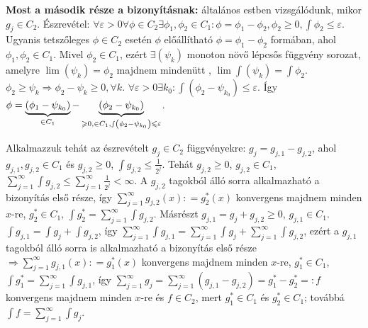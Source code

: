 \documentclass[12pt,a4paper]{scrartcl}
\newenvironment{bizonyitas}{}{}
\begin{document}
\begin{bizonyitas}
\textbf{Most a második része a bizonyításnak:} általános estben
vizsgálódunk, mikor \(g_{j} \in C_{2}\). Észrevétel:
\(\forall\varepsilon > 0\forall\phi \in C_{2}\exists\phi_{1},\phi_{2} \in C_{1}:\phi = \phi_{1} - \phi_{2},\phi_{2} \geq 0,{\int{\phi_{2} \leq \varepsilon}}\).
Ugyanis tetszőleges \(\phi \in C_{2}\) esetén \(\phi\) előállítható
\(\phi = \phi_{1} - \phi_{2}\) formában, ahol
\(\phi_{1},\phi_{2} \in C_{1}\). Mivel \(\phi_{2} \in C_{1}\), ezért
\(\exists\left( \psi_{k} \right)\) monoton növő lépcsős függvény
sorozat, amelyre \(\lim\left( \psi_{k} \right) = \phi_{2}\) majdnem
mindenütt , \(\lim{\int{\left( \psi_{k} \right) = {\int\phi_{2}}}}\).
\(\left. \phi_{2} \geq \psi_{k}\Rightarrow\phi_{2} - \psi_{k} \geq 0,\forall k \right.\).
\(\forall\varepsilon > 0\exists k_{0}:{\int\left( {\phi_{2} - \psi_{k_{0}}} \right)} \leq \varepsilon\).
Így
\(\phi = \underbrace {\left( {{\phi _1} - {\psi _{{k_0}}}} \right)}_{ \in {C_1}} - \underbrace {\left( {{\phi _2} - {\psi _{{k_0}}}} \right)}_{ \geqslant 0, \in {C_1},\smallint \left( {{\phi _2} - {\psi _{{k_0}}}} \right) \leqslant \varepsilon }\).

Alkalmazzuk tehát az észrevételt \(g_{j} \in C_{2}\) függvényekre:
\(g_{j} = g_{j,1} - g_{j,2}\), ahol \(g_{j,1},g_{j,2} \in C_{1}\) és
\(g_{j,2} \geq 0\), \({\int g_{j,2}} \leq \frac{1}{2^{j}}\). Tehát
\(g_{j,2} \geq 0\), \(g_{j,2} \in C_{1}\),
\(\sum\limits_{j = 1}^{\infty}{{\int{g_{j,2} \leq {\sum\limits_{j = 1}^{\infty}\frac{1}{2^{j}}}}} < \infty}\).
A \(g_{j,2}\) tagokból álló sorra alkalmazható a bizonyítás első része,
így
\({\sum\limits_{j = 1}^{\infty}{g_{j,2}\left( x \right)}}: = g_{2}^{*}\left( x \right)\)
konvergens majdnem minden \(x\)-re, \(g_{2}^{*} \in C_{1}\),
\({\int g_{2}^{*}} = \sum\limits_{j = 1}^{\infty}{\int g_{j,2}}\).
Másrészt \(g_{j,1} = g_{j} + g_{j,2} \geq 0\), \(g_{j,1} \in C_{1}\).
\(\int{g_{j,1} = {\int g_{j}} + {\int g_{j,2}}}\), így
\({\sum\limits_{j = 1}^{\infty}{{\int g_{j,1}} = {\sum\limits_{j = 1}^{\infty}{\int g_{j}}}}} + {\sum\limits_{j = 1}^{\infty}{\int g_{j,2}}}\),
ezért a \(g_{j,1}\) tagokból álló sorra is alkalmazható a bizonyítás
első része
\(\left. \Rightarrow\sum\limits_{j = 1}^{\infty}g_{j,1}\left( x \right): = g_{1}^{*}\left( x \right) \right.\)
konvergens majdnem minden \(x\)-re, \(g_{1}^{*} \in C_{1}\),
\({\int g_{1}^{*}} = \sum\limits_{j = 1}^{\infty}{\int g_{j,1}}\), így
\(\sum\limits_{j = 1}^{\infty}g_{j} = \sum\limits_{j = 1}^{\infty}\left( {g_{j,1} - g_{j,2}} \right) = g_{1}^{*} - g_{2}^{*} = :f\)
konvergens majdnem minden \(x\)-re és \(f \in C_{2}\), mert
\(g_{1}^{*} \in C_{1}\) és \(g_{2}^{*} \in C_{1}\); továbbá
\({\int f} = {\sum\limits_{j = 1}^{\infty}{\int g_{j}}}\).

\end{bizonyitas}
\end{document}
